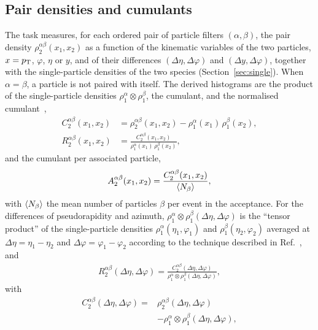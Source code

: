 \subsection{Pair densities and cumulants}
\label{sec:pairs}

The task  measures, for each ordered pair of particle filters $(\alpha,\beta)$, the pair
density $\rho_2^{\alpha\beta}(x_1,x_2)$ as a function of the kinematic variables of the two particles, $x=p_{\mathrm{T}}$,
$\varphi$, $\eta$ or $y$, and of their differences $(\Delta\eta,\Delta\varphi)$ and $(\Delta y,\Delta\varphi)$, together with
the single-particle densities of the two species (Section~\ref{sec:single}). When $\alpha=\beta$, a particle is not
paired with itself. The derived histograms are the product of the single-particle densities $\rho_1^\alpha\otimes\rho_1^\beta$,
the cumulant, and the normalised cumulant~\cite{Pruneau:2002yf,Pruneau:2017book},
\begin{align}
  C_2^{\alpha\beta}(x_1,x_2) & = \rho_2^{\alpha\beta}(x_1,x_2) - \rho_1^{\alpha}(x_1)\,\rho_1^{\beta}(x_2), \label{eq:C2} \\
  R_2^{\alpha\beta}(x_1,x_2) & = \frac{C_2^{\alpha\beta}(x_1,x_2)}{\rho_1^{\alpha}(x_1)\,\rho_1^{\beta}(x_2)}, \label{eq:R2}
\end{align}
and the cumulant per associated particle,
\begin{equation}
  A_2^{\alpha\beta}(x_1,x_2) = \frac{C_2^{\alpha\beta}(x_1,x_2)}{\left\langle N_\beta \right\rangle},
  \label{eq:A2}
\end{equation}
with $\left\langle N_\beta \right\rangle$ the mean number of particles $\beta$ per event in the acceptance. For the differences of
pseudorapidity and azimuth, $\rho_1^{\alpha}\otimes \rho_1^{\beta}(\Delta \eta, \Delta \varphi)$ is the ``tensor
product'' of the single-particle densities $\rho_1^{\alpha}(\eta_1,\varphi_1)$ and $\rho_1^{\beta}(\eta_2,\varphi_2)$
averaged at $\Delta \eta= \eta_1-\eta_2$ and $\Delta \varphi= \varphi_1-\varphi_2$ according to the technique described
in Ref.~\cite{Adam:2017ucq}, and
\begin{align}
  R_2^{\alpha\beta}(\Delta \eta, \Delta \varphi) = \frac{C_2^{\alpha\beta}(\Delta \eta, \Delta \varphi)}{\rho_1^{\alpha}\otimes \rho_1^{\beta}(\Delta \eta, \Delta \varphi)},
\end{align}
with 
\begin{align}
C_2^{\alpha\beta}(\Delta \eta, \Delta \varphi) =& \rho_2^{\alpha\beta}(\Delta \eta, \Delta \varphi) \nonumber \\
& - \rho_1^{\alpha}\otimes \rho_1^{\beta}(\Delta \eta, \Delta \varphi),
\end{align}
